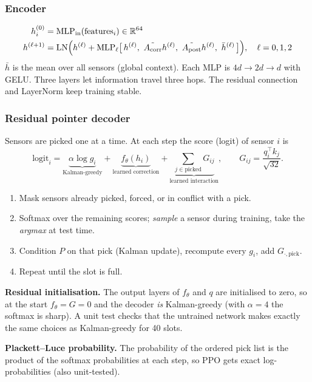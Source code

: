 \subsubsection{Encoder}
\begin{align*}
  h^{(0)}_i &= \mathrm{MLP}_{\text{in}}(\text{features}_i)\in\mathbb R^{64}\\
  h^{(\ell+1)} &= \mathrm{LN}\Big(h^{(\ell)} + \mathrm{MLP}_\ell\big[\,h^{(\ell)},\ \tilde\Acorr h^{(\ell)},\ \tilde\Apost h^{(\ell)},\ \bar h^{(\ell)}\,\big]\Big),\quad \ell=0,1,2
\end{align*}
$\bar h$ is the mean over all sensors (global context). Each MLP is $4d\to2d\to d$ with GELU. Three layers let
information travel three hops. The residual connection and LayerNorm keep training stable.

\subsubsection{Residual pointer decoder}
Sensors are picked one at a time. At each step the score (logit) of sensor $i$ is
\[
  \text{logit}_i = \underbrace{\alpha\log g_i}_{\text{Kalman-greedy}} + \underbrace{f_\theta(h_i)}_{\text{learned correction}}
  + \underbrace{\textstyle\sum_{j\in\text{picked}} G_{ij}}_{\text{learned interaction}},\qquad G_{ij}=\frac{q_i^\top k_j}{\sqrt{32}}.
\]
\begin{enumerate}
  \item Mask sensors already picked, forced, or in conflict with a pick.
  \item Softmax over the remaining scores; \emph{sample} a sensor during training, take the \emph{argmax} at test time.
  \item Condition $P$ on that pick (Kalman update), recompute every $g_i$, add $G_{\cdot,\text{pick}}$.
  \item Repeat until the slot is full.
\end{enumerate}

\textbf{Residual initialisation.} The output layers of $f_\theta$ and $q$ are initialised to zero, so at the start
$f_\theta=G=0$ and the decoder \emph{is} Kalman-greedy (with $\alpha=4$ the softmax is sharp). A unit test checks that
the untrained network makes exactly the same choices as Kalman-greedy for 40 slots.

\textbf{Plackett--Luce probability.} The probability of the ordered pick list is the product of the softmax
probabilities at each step, so PPO gets exact log-probabilities (also unit-tested).

